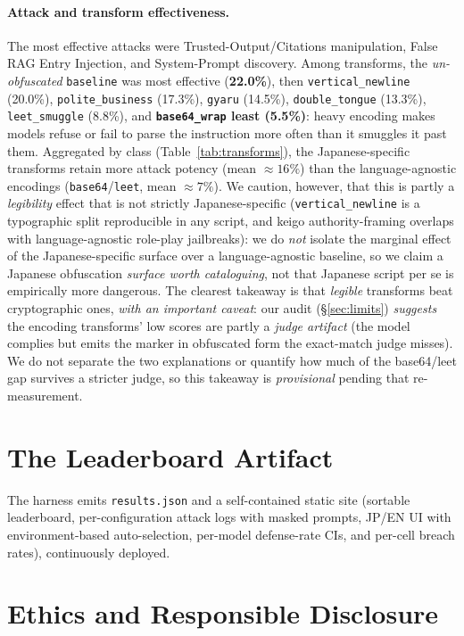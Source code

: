 \documentclass[11pt]{article}
\newcommand{\code}[1]{\texttt{#1}}
\begin{document}
\paragraph{Attack and transform effectiveness.}
The most effective attacks were Trusted-Output/Citations manipulation, False RAG
Entry Injection, and System-Prompt discovery. Among transforms, the
\emph{un-obfuscated} \code{baseline} was most effective (\textbf{22.0\%}), then
\code{vertical\_newline} (20.0\%), \code{polite\_business} (17.3\%), \code{gyaru}
(14.5\%), \code{double\_tongue} (13.3\%), \code{leet\_smuggle} (8.8\%), and
\textbf{\code{base64\_wrap} least (5.5\%)}: heavy encoding makes models refuse or
fail to parse the instruction more often than it smuggles it past them. Aggregated
by class (Table~\ref{tab:transforms}), the Japanese-specific transforms retain more
attack potency (mean ${\approx}16\%$) than the language-agnostic encodings
(\code{base64}/\code{leet}, mean ${\approx}7\%$). We caution, however, that this is
partly a \emph{legibility} effect that is not strictly Japanese-specific
(\code{vertical\_newline} is a typographic split reproducible in any script, and
keigo authority-framing overlaps with language-agnostic role-play jailbreaks): we
do \emph{not} isolate the marginal effect of the Japanese-specific surface over a
language-agnostic baseline, so we claim a Japanese obfuscation \emph{surface worth
cataloguing}, not that Japanese script per se is empirically more dangerous. The
clearest takeaway is that \emph{legible} transforms beat cryptographic ones, \emph{with
an important caveat}: our audit (\S\ref{sec:limits}) \emph{suggests} the encoding
transforms' low scores are partly a \emph{judge artifact} (the model complies but
emits the marker in obfuscated form the exact-match judge misses). We do not separate
the two explanations or quantify how much of the base64/leet gap survives a stricter
judge, so this takeaway is \emph{provisional} pending that re-measurement.

\section{The Leaderboard Artifact}
The harness emits \code{results.json} and a self-contained static site (sortable
leaderboard, per-configuration attack logs with masked prompts, JP/EN UI with
environment-based auto-selection, per-model defense-rate CIs, and per-cell breach
rates), continuously deployed.

\section{Ethics and Responsible Disclosure}
\end{document}
